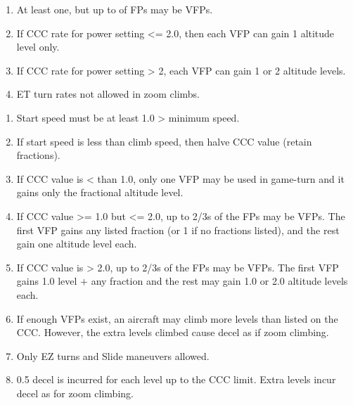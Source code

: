 \begin{table*}
\begin{multicols}{2}

\begin{enumerate}[nosep]
    \item At least one, but up to {\twothirds} of FPs may be VFPs.
    \item If CCC rate for power setting <= 2.0, then each VFP can gain 1 altitude level only.
    \item If CCC rate for power setting > 2, each VFP can gain 1 or 2 altitude levels.
    \item ET turn rates not allowed in zoom climbs.
\end{enumerate}

\begin{enumerate}[nosep]
    \item Start speed must be at least 1.0 > minimum speed.
    \item If start speed is less than climb speed, then halve CCC value (retain fractions).
    \item If CCC value is < than 1.0, only one VFP may be used in game-turn and it gains only the fractional altitude level.
    \item If CCC value >= 1.0 but <= 2.0, up to 2/3s of the FPs may be VFPs. The first VFP gains any listed fraction (or 1 if no fractions listed), and the rest gain one altitude level each.
    \item If CCC value is > 2.0, up to 2/3s of the FPs may be VFPs. The first VFP gains 1.0 level $+$ any fraction and the rest may gain 1.0 or 2.0 altitude levels each.
    \item If enough VFPs exist, an aircraft may climb more levels than listed on the CCC. However, the extra levels climbed cause decel as if zoom climbing.
    \item Only EZ turns and Slide maneuvers allowed.
    \item 0.5 decel is incurred for each level up to the CCC limit. Extra levels incur decel as for zoom climbing.
\end{enumerate}


\end{multicols}
\end{table*}
